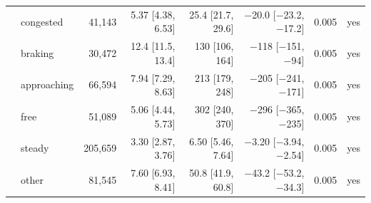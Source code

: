 \begin{longtable}{llrrrrrl}
 & congested & 41,143 & 5.37 [4.38, 6.53] & 25.4 [21.7, 29.6] & $-$20.0 [$-$23.2, $-$17.2] & 0.005 & yes \\
 & braking & 30,472 & 12.4 [11.5, 13.4] & 130 [106, 164] & $-$118 [$-$151, $-$94] & 0.005 & yes \\
 & approaching & 66,594 & 7.94 [7.29, 8.63] & 213 [179, 248] & $-$205 [$-$241, $-$171] & 0.005 & yes \\
 & free & 51,089 & 5.06 [4.44, 5.73] & 302 [240, 370] & $-$296 [$-$365, $-$235] & 0.005 & yes \\
 & steady & 205,659 & 3.30 [2.87, 3.76] & 6.50 [5.46, 7.64] & $-$3.20 [$-$3.94, $-$2.54] & 0.005 & yes \\
 & other & 81,545 & 7.60 [6.93, 8.41] & 50.8 [41.9, 60.8] & $-$43.2 [$-$53.2, $-$34.3] & 0.005 & yes \\
\end{longtable}
\endgroup
